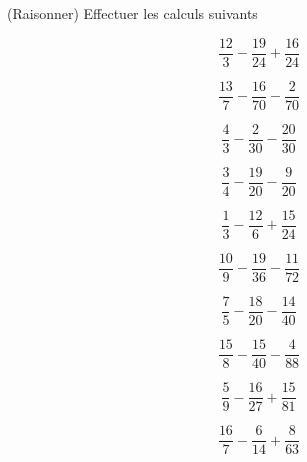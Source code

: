  (Raisonner) Effectuer les calculs suivants

\begin{multicols}{5}
$$\dfrac{12}{3}-\dfrac{19}{24}+\dfrac{16}{24}$$

$$\dfrac{13}{7}-\dfrac{16}{70}-\dfrac{2}{70}$$

$$\dfrac{4}{3}-\dfrac{2}{30}-\dfrac{20}{30}$$

$$\dfrac{3}{4}-\dfrac{19}{20}-\dfrac{9}{20}$$

$$\dfrac{1}{3}-\dfrac{12}{6}+\dfrac{15}{24}$$

$$\dfrac{10}{9}-\dfrac{19}{36}-\dfrac{11}{72}$$

$$\dfrac{7}{5}-\dfrac{18}{20}-\dfrac{14}{40}$$

$$\dfrac{15}{8}-\dfrac{15}{40}-\dfrac{4}{88}$$

$$\dfrac{5}{9}-\dfrac{16}{27}+\dfrac{15}{81}$$

$$\dfrac{16}{7}-\dfrac{6}{14}+\dfrac{8}{63}$$

\end{multicols}